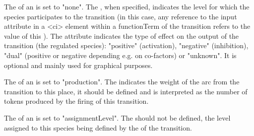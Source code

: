 \medskip
\LRG The  of an  is set to "none". The , when specified, indicates the level for which the species participates to the transition (in this case, any reference to the input  attribute in a <ci> element within a functionTerm of the transition refers to the value of this  ). The  attribute indicates the type of effect on the output of the transition (the regulated species): "positive" (activation), "negative" (inhibition), "dual" (positive or negative depending e.g. on co-factors) or "unknown". It is optional and mainly used for graphical purposes.

\medskip
\PN  The  of an  is set to "production". The  indicates the weight of the arc from the transition to this place, it should be defined and is interpreted as  the number of tokens produced by the firing of this transition.

\medskip
\LRG The  of an  is set to "assignmentLevel". The  should not be defined, the level assigned to this species being defined by the  of the transition.







